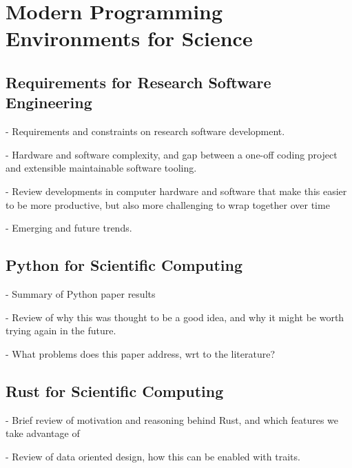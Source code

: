 \chapter{Modern Programming Environments for Science}\label{chpt:programming_for_science}
\thispagestyle{chaptertitle} %


\section{Requirements for Research Software Engineering}

- Requirements and constraints on research software development.

- Hardware and software complexity, and gap between a one-off coding project and extensible maintainable software tooling.

- Review developments in computer hardware and software that make this easier to be more productive, but also more challenging to wrap together over time

- Emerging and future trends.


\section{Python for Scientific Computing}

- Summary of Python paper results

- Review of why this was thought to be a good idea, and why it might be worth trying again in the future.

- What problems does this paper address, wrt to the literature?

\section{Rust for Scientific Computing}

- Brief review of motivation and reasoning behind Rust, and which features we take advantage of

- Review of data oriented design, how this can be enabled with traits.

% 
% 
% 
% 
